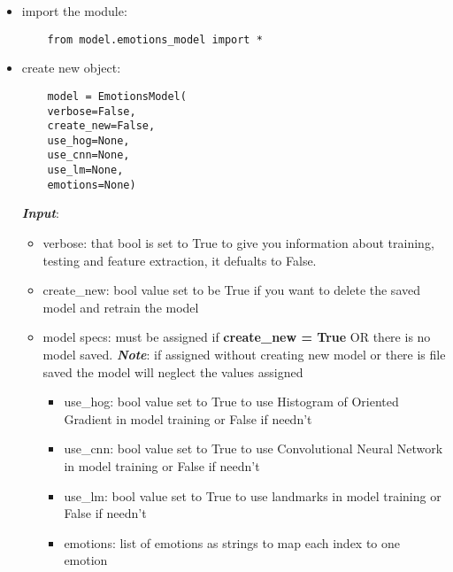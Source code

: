 \begin{itemize}
	\item import the module:
	\begin{verbatim}
	from model.emotions_model import *
	\end{verbatim}
	\item create new object:
	\begin{verbatim}
	model = EmotionsModel(
	verbose=False,
	create_new=False,
	use_hog=None,
	use_cnn=None,
	use_lm=None,
	emotions=None)
	\end{verbatim}
	
	
	\noindent\textbf{\textit{Input}}:
	\begin{itemize}
		\item verbose: \newline
		that bool is set to True to give you information about training, testing and feature extraction, it defualts to False.
		\item create\_new: \newline
		bool value set to be True if you want to delete the saved model and retrain the model 
		\item model specs:\newline
		must be assigned if \textbf{create\_new = True} OR there is no model saved.
		\newline
		\textbf{\textit{Note}}: if assigned without creating new model or there is file saved the model will neglect the values assigned
		\begin{itemize}
			\item use\_hog: \newline
			bool value set to True to use Histogram of Oriented Gradient in model training or False if needn't
			\item use\_cnn: \newline
			bool value set to True to use Convolutional Neural Network in model training or False if needn't
			\item use\_lm: \newline
			bool value set to True to use landmarks in model training or False if needn't
			\item emotions: \newline
			list of emotions as strings to map each index to one emotion 
			
		\end{itemize}
		
	\end{itemize}
\end{itemize}


